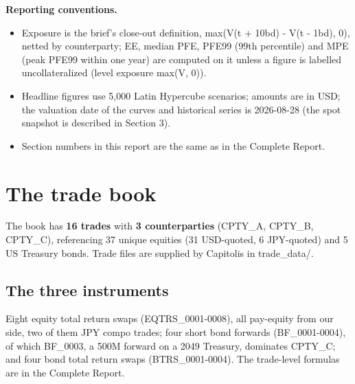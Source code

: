 \documentclass[11pt,letterpaper]{article}
\begin{document}
\textbf{Reporting conventions.}

\begin{itemize}
\item Exposure is the brief's close-out definition, max(V(t + 10bd) - V(t - 1bd), 0), netted by counterparty; EE, median PFE, PFE99 (99th percentile) and MPE (peak PFE99 within one year) are computed on it unless a figure is labelled uncollateralized (level exposure max(V, 0)).
\item Headline figures use 5,000 Latin Hypercube scenarios; amounts are in USD; the valuation date of the curves and historical series is 2026-08-28 (the spot snapshot is described in Section 3).
\item Section numbers in this report are the same as in the Complete Report.
\end{itemize}
\section{The trade book}
The book has \textbf{16 trades} with \textbf{3 counterparties} (CPTY\_A, CPTY\_B, CPTY\_C), referencing 37 unique equities (31 USD-quoted, 6 JPY-quoted) and 5 US Treasury bonds. Trade files are supplied by Capitolis in trade\_data/.

\subsection{The three instruments}
Eight equity total return swaps (EQTRS\_0001-0008), all pay-equity from our side, two of them JPY compo trades; four short bond forwards (BF\_0001-0004), of which BF\_0003, a 500M forward on a 2049 Treasury, dominates CPTY\_C; and four bond total return swaps (BTRS\_0001-0004). The trade-level formulas are in the Complete Report.
\end{document}
